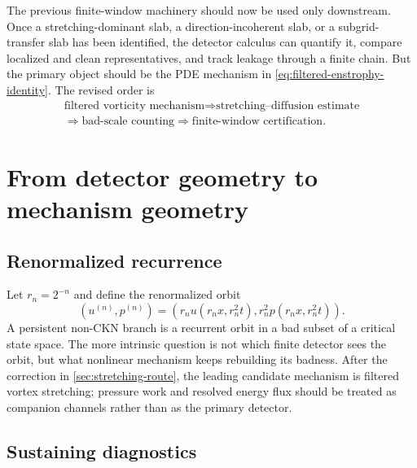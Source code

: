 \documentclass[11pt]{article}
\numberwithin{equation}{section}
\theoremstyle{remark}
\begin{document}
The previous finite-window machinery should now be used only downstream. Once a stretching-dominant slab, a direction-incoherent slab, or a subgrid-transfer slab has been identified, the detector calculus can quantify it, compare localized and clean representatives, and track leakage through a finite chain. But the primary object should be the PDE mechanism in \eqref{eq:filtered-enstrophy-identity}. The revised order is
\begin{equation}\label{eq:stretching-order}
\begin{gathered}
\text{filtered vorticity mechanism}
\Longrightarrow
\text{stretching--diffusion estimate}\\
\Longrightarrow
\text{bad-scale counting}
\Longrightarrow
\text{finite-window certification}.
\end{gathered}
\end{equation}

\section{From detector geometry to mechanism geometry}\label{sec:mechanism}

\subsection{Renormalized recurrence}

Let $r_n=2^{-n}$ and define the renormalized orbit
\[
(u^{(n)},p^{(n)})
=(r_nu(r_nx,r_n^2t),r_n^2p(r_nx,r_n^2t)).
\]
A persistent non-CKN branch is a recurrent orbit in a bad subset of a critical state space. The more intrinsic question is not which finite detector sees the orbit, but what nonlinear mechanism keeps rebuilding its badness. After the correction in \cref{sec:stretching-route}, the leading candidate mechanism is filtered vortex stretching; pressure work and resolved energy flux should be treated as companion channels rather than as the primary detector.

\subsection{Sustaining diagnostics}
\end{document}
